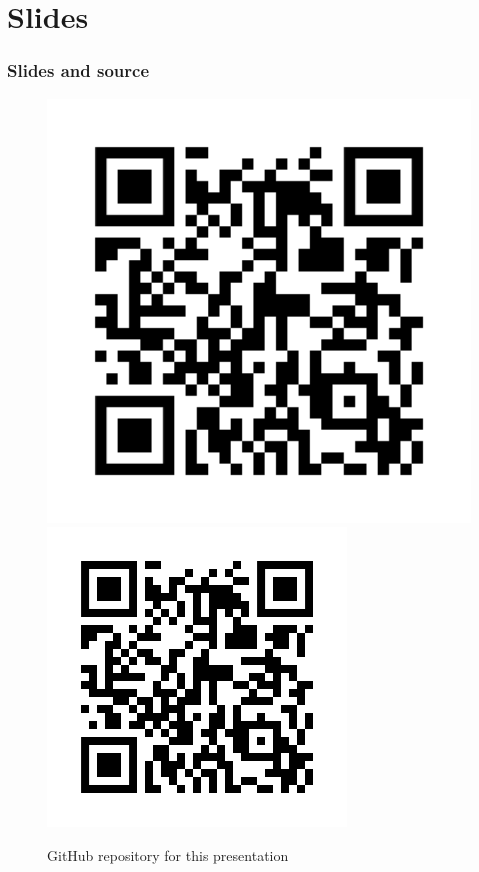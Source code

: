 \section*{Slides}
\begin{frame}[fragile]
    \frametitle{Slides and source}
    \begin{figure}
        \begin{center}
            {
                \includegraphics[width=1\textwidth,keepaspectratio]{./images/qr_code.png}
            }
            {
                \includegraphics[height=0.6\textheight,keepaspectratio]{./images/qr_code.png}
            }
            \caption{GitHub repository for this presentation\footnotemark}
        \end{center}
    \end{figure}

\end{frame}

